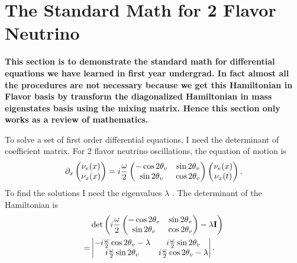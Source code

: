 \documentclass[letterpaper,12pt,english]{sphinxmanual}
\begin{document}
\section{The Standard Math for 2 Flavor Neutrino}
\label{vacuum:the-standard-math-for-2-flavor-neutrino}
\textbf{This section is to demonstrate the standard math for differential equations we have learned in first year undergrad. In fact almost all the procedures are not necessary because we get this Hamiltonian in Flavor basis by transform the diagonalized Hamiltonian in mass eigenstates basis using the mixing matrix. Hence this section only works as a review of mathematics.}

To solve a set of first order differential equations, I need the determinant of coefficient matrix. For 2 flavor neutrino oscillations, the equation of motion is
\begin{gather}
\begin{split}\partial_x \begin{pmatrix}
\nu_e(x) \\ \nu_x(x)
\end{pmatrix} = i \frac{\omega}{2} \begin{pmatrix}
-\cos 2\theta_v &    \sin 2\theta_v \\   \sin 2\theta_v & \cos 2\theta_v
\end{pmatrix} \begin{pmatrix}
\nu_e(x) \\ \nu_x(t)
\end{pmatrix}.\end{split}\notag
\end{gather}
To find the solutions I need the eigenvalues \(\lambda\) . The determinant of the Hamiltonian is
\begin{gather}
\begin{split}&\det \left(  i\frac{\omega}{2} \begin{pmatrix}
-\cos 2\theta_v &    \sin 2\theta_v \\   \sin 2\theta_v &  \cos 2\theta_v
\end{pmatrix} - \lambda \mathbf{I} \right) \\
=& \begin{vmatrix}
-i \frac{\omega}{2} \cos 2\theta_v - \lambda & i \frac{\omega}{2} \sin 2\theta_v \\
i \frac{\omega}{2} \sin 2\theta_v & i \frac{\omega}{2} \cos 2\theta_v - \lambda
\end{vmatrix} .\end{split}\notag
\end{gather}
\end{document}
